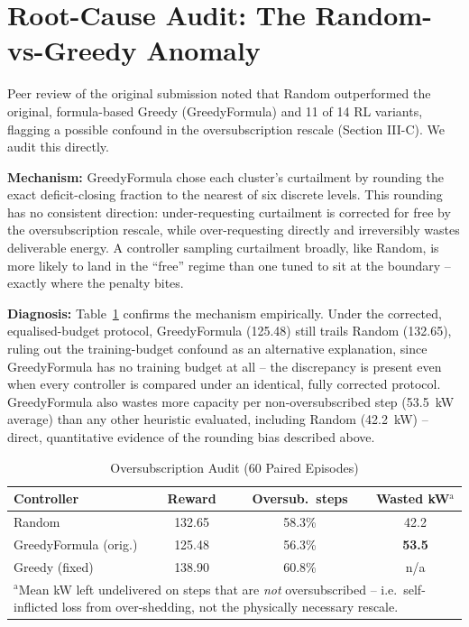 \documentclass[9pt,conference]{IEEEtran}
\begin{document}
\section{Root-Cause Audit: The Random-vs-Greedy Anomaly}
\label{sec:audit}
Peer review of the original submission noted that Random outperformed the original, formula-based Greedy (GreedyFormula) and 11 of 14 RL variants, flagging a possible confound in the oversubscription rescale (Section III-C). We audit this directly.

\textbf{Mechanism:} GreedyFormula chose each cluster's curtailment by rounding the exact deficit-closing fraction to the nearest of six discrete levels. This rounding has no consistent direction: under-requesting curtailment is corrected for free by the oversubscription rescale, while over-requesting directly and irreversibly wastes deliverable energy. A controller sampling curtailment broadly, like Random, is more likely to land in the ``free'' regime than one tuned to sit at the boundary -- exactly where the penalty bites.

\textbf{Diagnosis:} Table~\ref{tab:audit} confirms the mechanism empirically. Under the corrected, equalised-budget protocol, GreedyFormula (125.48) still trails Random (132.65), ruling out the training-budget confound as an alternative explanation, since GreedyFormula has no training budget at all -- the discrepancy is present even when every controller is compared under an identical, fully corrected protocol. GreedyFormula also wastes more capacity per non-oversubscribed step (53.5~kW average) than any other heuristic evaluated, including Random (42.2~kW) -- direct, quantitative evidence of the rounding bias described above.

\begin{table}[tbp]
\caption{Oversubscription Audit (60 Paired Episodes)}
\label{tab:audit}
\begin{center}
\scriptsize
\begin{tabular}{|l|c|c|c|}
\hline
\textbf{Controller} & \textbf{Reward} & \textbf{Oversub.\ steps} & \textbf{Wasted kW}$^{\mathrm{a}}$ \\
\hline
Random & 132.65 & 58.3\% & 42.2 \\
GreedyFormula (orig.) & 125.48 & 56.3\% & \textbf{53.5} \\
Greedy (fixed) & 138.90 & 60.8\% & n/a \\
\hline
\multicolumn{4}{p{7.8cm}}{\scriptsize $^{\mathrm{a}}$Mean kW left undelivered on steps that are \emph{not} oversubscribed -- i.e.\ self-inflicted loss from over-shedding, not the physically necessary rescale.}
\end{tabular}
\end{center}
\end{table}
\end{document}
